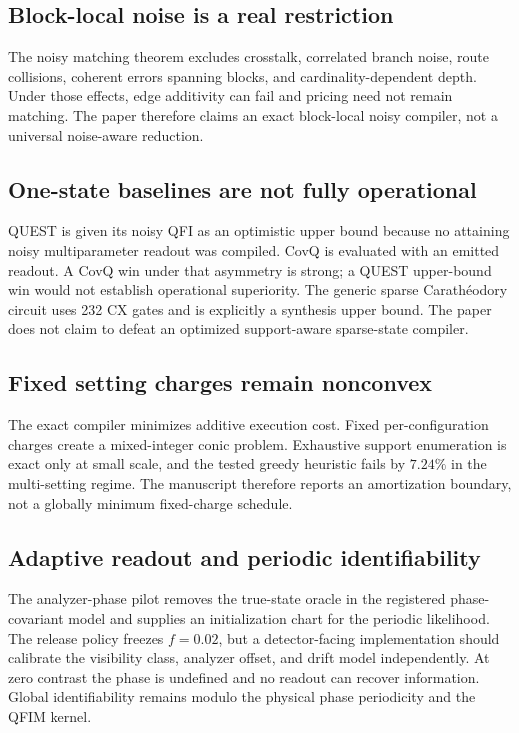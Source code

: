 \documentclass[11pt]{article}
\theoremstyle{definition}
\theoremstyle{remark}
\begin{document}
\subsection{Block-local noise is a real restriction}
The noisy matching theorem excludes crosstalk, correlated branch noise, route collisions, coherent errors spanning blocks, and cardinality-dependent depth. Under those effects, edge additivity can fail and pricing need not remain matching. The paper therefore claims an exact block-local noisy compiler, not a universal noise-aware reduction.

\subsection{One-state baselines are not fully operational}
QUEST is given its noisy QFI as an optimistic upper bound because no attaining noisy multiparameter readout was compiled. CovQ is evaluated with an emitted readout. A CovQ win under that asymmetry is strong; a QUEST upper-bound win would not establish operational superiority. The generic sparse Carath\'eodory circuit uses 232 CX gates and is explicitly a synthesis upper bound. The paper does not claim to defeat an optimized support-aware sparse-state compiler.

\subsection{Fixed setting charges remain nonconvex}
The exact compiler minimizes additive execution cost. Fixed per-configuration charges create a mixed-integer conic problem. Exhaustive support enumeration is exact only at small scale, and the tested greedy heuristic fails by $7.24\%$ in the multi-setting regime. The manuscript therefore reports an amortization boundary, not a globally minimum fixed-charge schedule.

\subsection{Adaptive readout and periodic identifiability}
The analyzer-phase pilot removes the true-state oracle in the registered phase-covariant model and supplies an initialization chart for the periodic likelihood. The release policy freezes $f=0.02$, but a detector-facing implementation should calibrate the visibility class, analyzer offset, and drift model independently. At zero contrast the phase is undefined and no readout can recover information. Global identifiability remains modulo the physical phase periodicity and the QFIM kernel.
\end{document}
